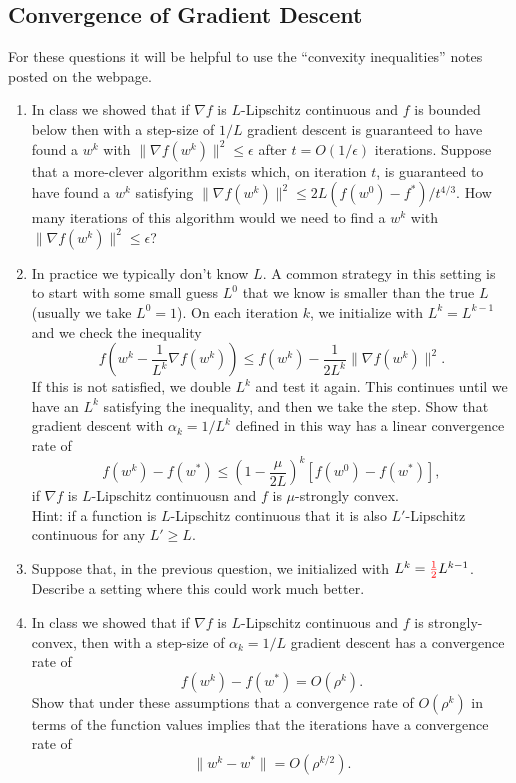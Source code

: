 \documentclass{article}
\def\blu#1{{\color{blu}#1}}
\def\red#1{{\color{red}#1}}
\def\norm#1{\|#1\|}
\def\half{\frac 1 2}
\def\enum#1{\begin{enumerate}#1\end{enumerate}}
\begin{document}
\subsection{Convergence of Gradient Descent}

For these questions it will be helpful to use the ``convexity inequalities'' notes posted on the webpage.

\enum{
\item In class we showed that if $\nabla f$ is $L$-Lipschitz continuous and $f$ is bounded below then with a step-size of $1/L$ gradient descent is guaranteed to have found a $w^k$ with $\norm{\nabla f(w^k)}^2 \leq \epsilon$ after $t = O(1/\epsilon)$ iterations. Suppose that a more-clever algorithm exists which, on iteration $t$, is guaranteed to have found a $w^k$ satisfying $\norm{\nabla f(w^k)}^2 \leq 2L(f(w^0) - f^*)/t^{4/3}$. \blu{How many iterations of this algorithm would we need to find a $w^k$ with $\norm{\nabla f(w^k)}^2 \leq \epsilon$?}
\item In practice we typically don't know $L$. A common strategy in this setting is to start with some small guess $L^0$ that we know is smaller than the true $L$ (usually we take $L^0=1$). On each iteration $k$, we initialize with $L^k = L^{k-1}$ and we check the inequality
\[
f\left(w^k - \frac{1}{L^k}\nabla f(w^k)\right) \leq f(w^k) - \frac{1}{2L^k}\norm{\nabla f(w^k)}^2.
\]
If this is not satisfied, we double $L^k$ and test it again. This continues until we have an $L^k$ satisfying the inequality, and then we take the step. \blu{Show that gradient descent with $\alpha_k = 1/L^k$ defined in this way has a linear convergence rate of
\[
f(w^k) - f(w^*) \leq \left(1 - \frac{\mu}{2L}\right)^k[f(w^0) - f(w^*)],
\]
\red{if $\nabla f$ is $L$-Lipschitz continuousn and $f$ is $\mu$-strongly convex.}\\
} Hint: if a function is $L$-Lipschitz continuous that it is also $L'$-Lipschitz continuous for any $L' \geq L$.
\item Suppose that, in the previous question, we initialized with $L^k = \red{\half}L^{k-1}$. \blu{Describe a setting where this could work much better}.
\item In class we showed that if $\nabla f$ is $L$-Lipschitz continuous and $f$ is strongly-convex, then with a step-size of $\alpha_k = 1/L$ gradient descent has a convergence rate of 
\[
f(w^k) - f(w^*) = O(\rho^k).
\]
\blu{Show that under these assumptions that a convergence rate of $O(\rho^k)$ in terms of the function values implies that the iterations have a convergence rate of
\[
\norm{w^k - w^*} = O(\rho^{k/2}).
\]}
}
\end{document}
